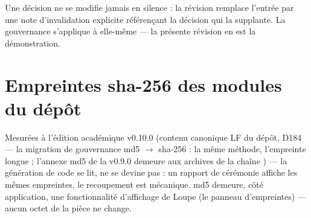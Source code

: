 Une décision ne se modifie jamais en silence : la révision remplace l'entrée par une note
d'invalidation explicite référençant la décision qui la supplante. La gouvernance
s'applique à elle-même — la présente révision en est la démonstration.

\appendix
\section{Empreintes sha-256 des modules du dépôt}\label{sec:empreintes}

Mesurées à l'édition académique v0.10.0 (contenu canonique LF du dépôt,
D184 — la migration de gouvernance md5 $\to$ sha-256 : la même méthode,
l'empreinte longue ; l'annexe md5 de la v0.9.0 demeure aux archives de la
chaîne ) — la génération de code se lit, ne se devine pas :
un rapport de cérémonie affiche les mêmes empreintes, le recoupement est
mécanique. md5 demeure, côté application, une fonctionnalité d'affichage de
Loupe (le panneau d'empreintes) — aucun octet de la pièce ne change.

